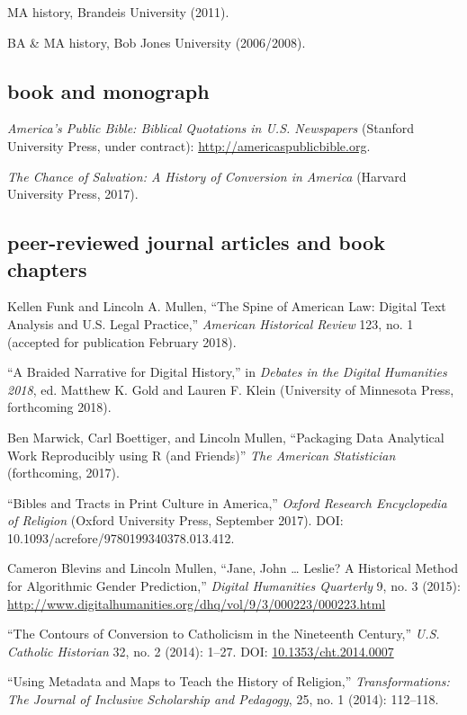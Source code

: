 \documentclass[11pt]{article}
\begin{document}
MA history, Brandeis University (2011).

BA \& MA history, Bob Jones University (2006/2008).

\subsection{book and monograph}\label{books}

\emph{America's Public Bible: Biblical Quotations in U.S. Newspapers} 
(Stanford University Press, under contract): 
\url{http://americaspublicbible.org}.

\emph{The Chance of Salvation: A History of Conversion in America} (Harvard 
University Press, 2017).

\subsection{peer-reviewed journal articles and book chapters}\label{peer-reviewed}

Kellen Funk and Lincoln A. Mullen, ``The Spine of American Law: Digital Text 
Analysis and U.S. Legal Practice,'' \emph{American Historical Review} 123, no. 1 (accepted for publication February 2018). 

``A Braided Narrative for Digital History,'' in \emph{Debates in the Digital 
  Humanities 2018}, ed. Matthew K. Gold and Lauren F. Klein (University of 
Minnesota Press, forthcoming 2018).

Ben Marwick, Carl Boettiger, and Lincoln Mullen, ``Packaging Data Analytical 
Work Reproducibly using R (and Friends)'' \emph{The American Statistician} 
(forthcoming, 2017).

``Bibles and Tracts in Print Culture in America,'' \emph{Oxford 
  Research Encyclopedia of Religion} (Oxford University Press, September 2017). DOI: 10.1093/acrefore/9780199340378.013.412.

Cameron Blevins and Lincoln Mullen, ``Jane, John \ldots{} Leslie? A
Historical Method for Algorithmic Gender Prediction,'' \emph{Digital
  Humanities Quarterly} 9, no. 3 (2015): 
\url{http://www.digitalhumanities.org/dhq/vol/9/3/000223/000223.html}

``The Contours of Conversion to Catholicism in the Nineteenth Century,''
\emph{U.S. Catholic Historian} 32, no. 2 (2014): 1--27. DOI:
\href{http://dx.doi.org/10.1353/cht.2014.0007}{10.1353/cht.2014.0007}

``Using Metadata and Maps to Teach the History of Religion,''
\emph{Transformations: The Journal of Inclusive Scholarship and
  Pedagogy}, 25, no. 1 (2014): 112--118.
\end{document}
